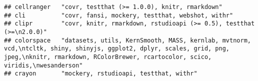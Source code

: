\documentclass[]{article}
\begin{document}
\begin{verbatim}
## cellranger   "covr, testthat (>= 1.0.0), knitr, rmarkdown"                                                                                                                                                                                                                                                                                                                                                                                                                                                                                                                                             
## cli          "covr, fansi, mockery, testthat, webshot, withr"                                                                                                                                                                                                                                                                                                                                                                                                                                                                                                                                          
## clipr        "covr, knitr, rmarkdown, rstudioapi (>= 0.5), testthat (>=\n2.0.0)"                                                                                                                                                                                                                                                                                                                                                                                                                                                                                                                       
## colorspace   "datasets, utils, KernSmooth, MASS, kernlab, mvtnorm, vcd,\ntcltk, shiny, shinyjs, ggplot2, dplyr, scales, grid, png, jpeg,\nknitr, rmarkdown, RColorBrewer, rcartocolor, scico, viridis,\nwesanderson"                                                                                                                                                                                                                                                                                                                                                                                   
## crayon       "mockery, rstudioapi, testthat, withr"                                                                                                                                                                                                                                                                                                                                                                                                                                                                                                                                                    

\end{verbatim}
\end{document}
